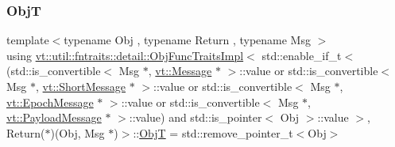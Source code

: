 \subsubsection{\texorpdfstring{ObjT}{ObjT}}
{\footnotesize\ttfamily template$<$typename Obj , typename Return , typename Msg $>$ \\
using \hyperlink{structvt_1_1util_1_1fntraits_1_1detail_1_1_obj_func_traits_impl}{vt\+::util\+::fntraits\+::detail\+::\+Obj\+Func\+Traits\+Impl}$<$ std\+::enable\+\_\+if\+\_\+t$<$(std\+::is\+\_\+convertible$<$ Msg $\ast$, \hyperlink{namespacevt_a3a3ddfef40b4c90915fa43cdd5f129ea}{vt\+::\+Message} $\ast$ $>$\+::value or std\+::is\+\_\+convertible$<$ Msg $\ast$, \hyperlink{namespacevt_a1125ac1da6c0bbf141e0ea0739d7602d}{vt\+::\+Short\+Message} $\ast$ $>$\+::value or std\+::is\+\_\+convertible$<$ Msg $\ast$, \hyperlink{namespacevt_ad67368ffae52d7325002586b41bb150e}{vt\+::\+Epoch\+Message} $\ast$ $>$\+::value or std\+::is\+\_\+convertible$<$ Msg $\ast$, \hyperlink{namespacevt_a89a92229c5622b855c02c549f83a1a68}{vt\+::\+Payload\+Message} $\ast$ $>$\+::value) and std\+::is\+\_\+pointer$<$ Obj $>$\+::value $>$, Return($\ast$)(Obj, Msg $\ast$)$>$\+::\hyperlink{structvt_1_1util_1_1fntraits_1_1detail_1_1_obj_func_traits_impl_3_01std_1_1enable__if__t_3_07std893b55e280057f64eb5acd3df924485e_a32abbdb49b0ae285449152af59d20fe9}{ObjT} =  std\+::remove\+\_\+pointer\+\_\+t$<$Obj$>$}

